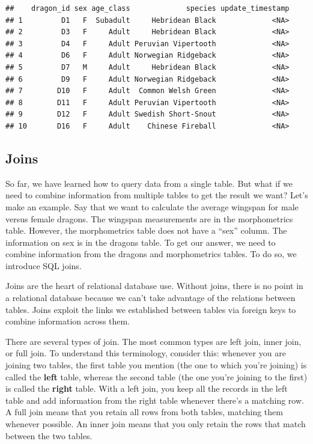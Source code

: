 \documentclass[
]{book}
\begin{document}
\begin{verbatim}
##    dragon_id sex age_class             species update_timestamp
## 1         D1   F  Subadult     Hebridean Black             <NA>
## 2         D3   F     Adult     Hebridean Black             <NA>
## 3         D4   F     Adult Peruvian Vipertooth             <NA>
## 4         D6   F     Adult Norwegian Ridgeback             <NA>
## 5         D7   M     Adult     Hebridean Black             <NA>
## 6         D9   F     Adult Norwegian Ridgeback             <NA>
## 7        D10   F     Adult  Common Welsh Green             <NA>
## 8        D11   F     Adult Peruvian Vipertooth             <NA>
## 9        D12   F     Adult Swedish Short-Snout             <NA>
## 10       D16   F     Adult    Chinese Fireball             <NA>
\end{verbatim}

\hypertarget{joins}{%
\subsection{Joins}\label{joins}}

So far, we have learned how to query data from a single table. But what if we
need to combine information from multiple tables to get the result we want?
Let's make an example. Say that we want to calculate the average wingspan for
male versus female dragons. The wingspan measurements are in the morphometrics
table. However, the morphometrics table does not have a ``sex'' column. The
information on sex is in the dragons table. To get our answer, we need to
combine information from the dragons and morphometrics tables. To do so, we
introduce SQL joins.

Joins are the heart of relational database use. Without joins, there is no point
in a relational database because we can't take advantage of the relations
between tables. Joins exploit the links we established between tables via
foreign keys to combine information across them.

There are several types of join. The most common types are left join, inner
join, or full join. To understand this terminology, consider this:
whenever you are joining two tables, the first table you mention (the one to
which you're joining) is called the \textbf{left} table, whereas the second table
(the one you're joining to the first) is called the \textbf{right} table. With a left
join, you keep all the records in the left table and add information from the
right table whenever there's a matching row. A full join means that you retain
all rows from both tables, matching them whenever possible. An inner join means
that you only retain the rows that match between the two tables.
\end{document}
